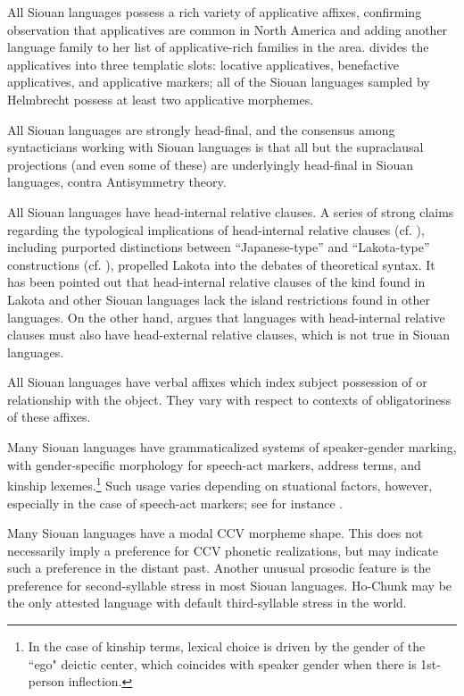 \begin{refsection}
All Siouan languages possess a rich variety of applicative affixes, confirming  observation that applicatives are common in North America and adding another language family to her list of applicative-rich families in the area. \citet{Helmbrecht2006a} divides the applicatives into three templatic slots: locative applicatives, benefactive applicatives, and applicative markers; all of the Siouan languages sampled by Helmbrecht possess at least two applicative morphemes.


All Siouan languages are strongly head-final, and the consensus among syntacticians working with Siouan languages is that all but the supraclausal projections (and even some of these) are underlyingly head-final in Siouan languages, contra  Antisymmetry theory.


All Siouan languages have head-internal relative clauses. A series of strong claims regarding the typological implications of head-internal relative clauses (cf. \citealt{Cole1987, Murasugi2000}), including purported distinctions between ``Japanese-type'' and ``Lakota-type'' constructions (cf. \citealt{Watanabe2004,Williamson1987,Bonneau1992}), propelled Lakota into the debates of theoretical syntax. It has been pointed out that head-internal relative clauses of the kind found in Lakota and other Siouan languages lack the island restrictions found in other languages. On the other hand, \citet{Murasugi2000} argues that languages with head-internal relative clauses must also have head-external relative clauses, which is not true in Siouan languages.


All Siouan languages have verbal affixes which index subject possession of or relationship with the object. They vary with respect to contexts of obligatoriness of these affixes.


Many Siouan languages have grammaticalized systems of speaker-gender marking, with gender-specific morphology for speech-act markers, address terms, and kinship lexemes.\footnote{In the case of kinship terms, lexical choice is driven by the gender of the ``ego" deictic center, which coincides with speaker gender when there is 1st-person inflection.} Such usage varies depending on stuational factors, however, especially in the case of speech-act markers; see for instance \citet{Trechter1995}.   


Many Siouan languages have a modal CCV morpheme shape. This does not necessarily imply a preference for CCV phonetic realizations, but may indicate such a preference in the distant past. Another unusual prosodic feature is the preference for second-syllable stress in most Siouan languages. Ho-Chunk may be the only attested language with default third-syllable stress in the world.



\end{refsection}
